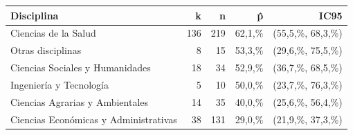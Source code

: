\begin{tabular}{lrrrr}
\toprule
Disciplina & k & n & p̂ & IC95\\
\midrule
Ciencias de la Salud & 136 & 219 & 62,1,\% & (55,5,\%, 68,3,\%)\\
Otras disciplinas & 8 & 15 & 53,3,\% & (29,6,\%, 75,5,\%)\\
Ciencias Sociales y Humanidades & 18 & 34 & 52,9,\% & (36,7,\%, 68,5,\%)\\
Ingeniería y Tecnología & 5 & 10 & 50,0,\% & (23,7,\%, 76,3,\%)\\
Ciencias Agrarias y Ambientales & 14 & 35 & 40,0,\% & (25,6,\%, 56,4,\%)\\

Ciencias Económicas y Administrativas & 38 & 131 & 29,0,\% & (21,9,\%, 37,3,\%)\\
\bottomrule
\end{tabular}
